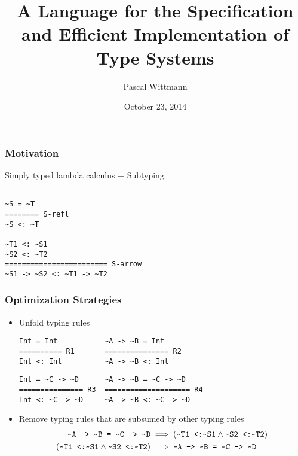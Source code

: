 \documentclass{beamer}
\title{A Language for the Specification and Efficient Implementation
  of Type Systems}
\author{Pascal Wittmann}
\institute{TU Darmstadt}
\date{October 23, 2014}
\newcommand{\textapprox}{\raisebox{0.5ex}{\texttildelow}}
\begin{document}
\begin{frame}[plain]
  \titlepage{}
\end{frame}

\begin{frame}[fragile]
  \frametitle{Motivation}
\begin{example}{Simply typed lambda calculus + Subtyping}
  \begin{lstlisting}

~S = ~T
======== S-refl
~S <: ~T

~T1 <: ~S1
~S2 <: ~T2    
======================== S-arrow 
~S1 -> ~S2 <: ~T1 -> ~T2
  \end{lstlisting}
\end{example}
\end{frame}

\begin{frame}[fragile]
  \frametitle{Optimization Strategies}
  \begin{itemize}
  \item<1-> Unfold typing rules
\begin{lstlisting}
Int = Int           ~A -> ~B = Int 
========== R1       =============== R2
Int <: Int          ~A -> ~B <: Int
\end{lstlisting}
\begin{lstlisting}
Int = ~C -> ~D      ~A -> ~B = ~C -> ~D
=============== R3  ==================== R4
Int <: ~C -> ~D     ~A -> ~B <: ~C -> ~D
\end{lstlisting}
  \item<2-> Remove typing rules that are subsumed by other typing
    rules
    \begin{align*}
      \text{\texttt{\textapprox A -> \textapprox B = \textapprox C ->
          \textapprox D}} &\implies (\text{\texttt{\textapprox T1
          <:\textapprox S1}} \land \text{\texttt{\textapprox S2 <:\textapprox T2}}) \\
      (\text{\texttt{\textapprox T1 <:\textapprox S1}} \land
      \text{\texttt{\textapprox S2 <:\textapprox T2}})
      &\implies \text{\texttt{\textapprox A -> \textapprox B =
          \textapprox C -> \textapprox D}} 
    \end{align*}
  \end{itemize}
\end{frame}
\end{document}
